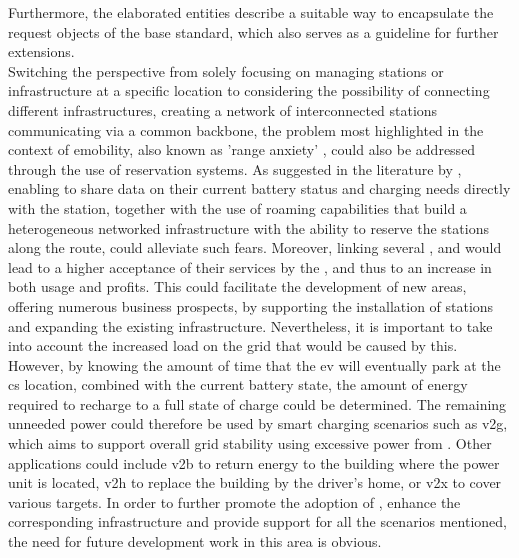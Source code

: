 Furthermore, the elaborated entities describe a suitable way to encapsulate the request objects of the base standard, which also serves as a guideline for further extensions. \\
\noindent Switching the perspective from solely focusing on managing stations or infrastructure at a specific location to considering the possibility of connecting different infrastructures, creating a network of interconnected stations communicating via a common backbone, the problem most highlighted in the context of \acrshort{emobility}, also known as 'range anxiety' \cite{rauh_understanding_2015}, could also be addressed through the use of reservation systems.
As suggested in the literature by \cite{zarkeshev_charging_2018}, enabling  to share data on their current battery status and charging needs directly with the station, together with the use of roaming capabilities that build a heterogeneous networked infrastructure with the ability to reserve the stations along the route, could alleviate such fears.
Moreover, linking several ,  and  would lead to a higher acceptance of their services by the , and thus to an increase in both usage and profits.
This could facilitate the development of new areas, offering numerous business prospects, by supporting the installation of stations and expanding the existing infrastructure.
Nevertheless, it is important to take into account the increased load on the grid that would be caused by this. However, by knowing the amount of time that the \acrshort{ev} will eventually park at the \acrshort{cs} location, combined with the current battery state, the amount of energy required to recharge to a full state of charge could be determined.
The remaining unneeded power could therefore be used by smart charging scenarios such as \acrshort{v2g}, which aims to support overall grid stability using excessive power from .
Other applications could include \acrshort{v2b} to return energy to the building where the power unit is located, \acrshort{v2h} to replace the building by the driver's home, or \acrshort{v2x} to cover various targets.
In order to further promote the adoption of , enhance the corresponding infrastructure and provide support for all the scenarios mentioned, the need for future development work in this area is obvious. \\
